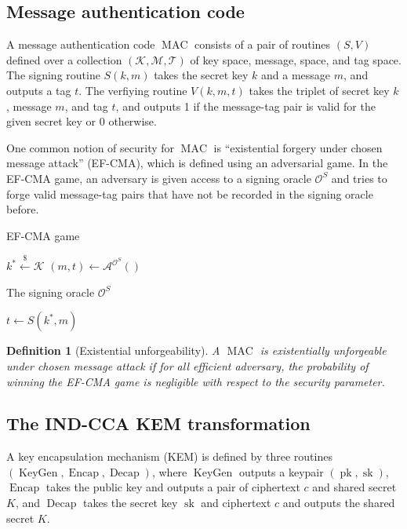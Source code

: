 \documentclass{article}
\newcommand{\leftsample}{\overset{{\scriptscriptstyle\$}}{\leftarrow}}
\newcommand{\keygen}{\operatorname{KeyGen}}
\newcommand{\pk}{\operatorname{pk}}
\newcommand{\sk}{\operatorname{sk}}
\newcommand{\encap}{\operatorname{Encap}}
\newcommand{\decap}{\operatorname{Decap}}
\newcommand{\mac}{\operatorname{MAC}}
\newcommand{\llbrack}{[\![}
\newcommand{\rrbrack}{]\!]}
\newtheorem{definition}{Definition}[section]
\begin{document}
\subsection{Message authentication code}
A message authentication code $\mac$ consists of a pair of routines $(S, V)$ defined over a collection $(\mathcal{K}, \mathcal{M}, \mathcal{T})$ of key space, message, space, and tag space. The signing routine $S(k, m)$ takes the secret key $k$ and a message $m$, and outputs a tag $t$. The verfiying routine $V(k, m, t)$ takes the triplet of secret key $k$, message $m$, and tag $t$, and outputs 1 if the message-tag pair is valid for the given secret key or 0 otherwise.

One common notion of security for $\mac$ is ``existential forgery under chosen message attack'' (EF-CMA), which is defined using an adversarial game. In the EF-CMA game, an adversary is given access to a signing oracle $\mathcal{O}^S$ and tries to forge valid message-tag pairs that have not be recorded in the signing oracle before.

\begin{multicols}{2}
    \begin{algorithm}[H]\label{alg:euf-cma-game}
        \caption{
            EF-CMA game
        }
        $k^\ast \leftsample \mathcal{K}$\;
        $(m, t) \leftarrow \mathcal{A}^{\mathcal{O}^S}()$\;
        \Return{
            $\llbrack (m, t) \not\in \mathcal{O}^{S} \rrbrack$
            and $\llbrack V(k^\ast, m, t) \rrbrack$
        }
    \end{algorithm}

    \begin{algorithm}[H]\label{alg:mac-signing-oracle}
        \caption{The signing oracle $\mathcal{O}^S$}
        $t \leftarrow S(k^\ast, m)$\;
    \end{algorithm}
\end{multicols}

\begin{definition}[Existential unforgeability]\label{def:euf-cma}
    A $\mac$ is existentially unforgeable under chosen message attack if for all efficient adversary, the probability of winning the EF-CMA game is negligible with respect to the security parameter.
\end{definition}

\subsection{The IND-CCA KEM transformation}
A key encapsulation mechanism (KEM) is defined by three routines $(\keygen, \encap, \decap)$, where $\keygen$ outputs a keypair $(\pk, \sk)$, $\encap$ takes the public key and outputs a pair of ciphertext $c$ and shared secret $K$, and $\decap$ takes the secret key $\sk$ and ciphertext $c$ and outputs the shared secret $K$.
\end{document}
